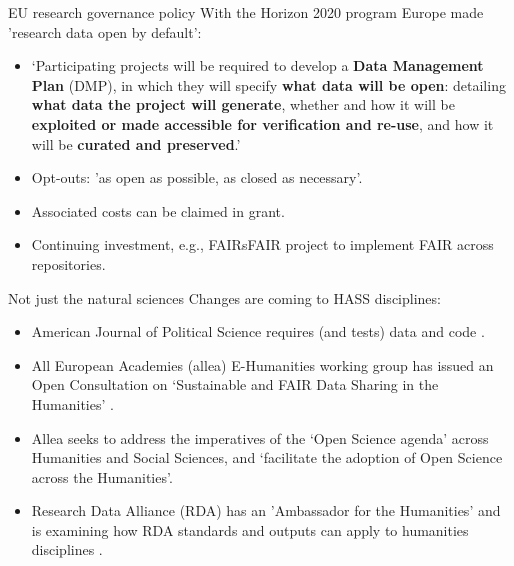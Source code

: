 \documentclass[aspectratio=169, 11pt]{beamer} %
\begin{document}
\begin{frame}{EU research governance policy}
  With the Horizon 2020 program \cite{European_Commission2019-an} Europe made 'research data open by default':
    \begin{itemize}[label=\textbullet]
        \item `Participating projects will be required to develop a \textbf{Data Management Plan} (DMP), in which they will specify \textbf{what data will be open}: detailing \textbf{what data the project will generate}, whether and how it will be \textbf{exploited or made accessible for verification and re-use}, and how it will be \textbf{curated and preserved}.'
        \item Opt-outs: 'as open as possible, as closed as necessary'.
        \item Associated costs can be claimed in grant.
        \item Continuing investment, e.g., FAIRsFAIR project \cite{Knaw-dans2019-sv} to implement FAIR across repositories.
    \end{itemize}
\end{frame}

\begin{frame}{Not just the natural sciences}
  Changes are coming to HASS disciplines:
    \begin{itemize}[label=\textbullet]
        \item American Journal of Political Science requires (and tests) data and code \cite{Jacoby2017-lw, Ajps2015-ex}.
        \item All European Academies (allea) E-Humanities working group \cite{Allea2019-wy} has issued an Open Consultation on `Sustainable and FAIR Data Sharing in the Humanities' \cite{Allea2019-aw}.
        \item Allea seeks to address the imperatives of the `Open Science agenda' across Humanities and Social Sciences, and `facilitate the adoption of Open Science across the Humanities'.
        \item Research Data Alliance (RDA) has an 'Ambassador for the Humanities' and is examining how RDA standards and outputs can apply to humanities disciplines \cite{Rda2019-wc}.
    \end{itemize}
\end{frame}
\end{document}
